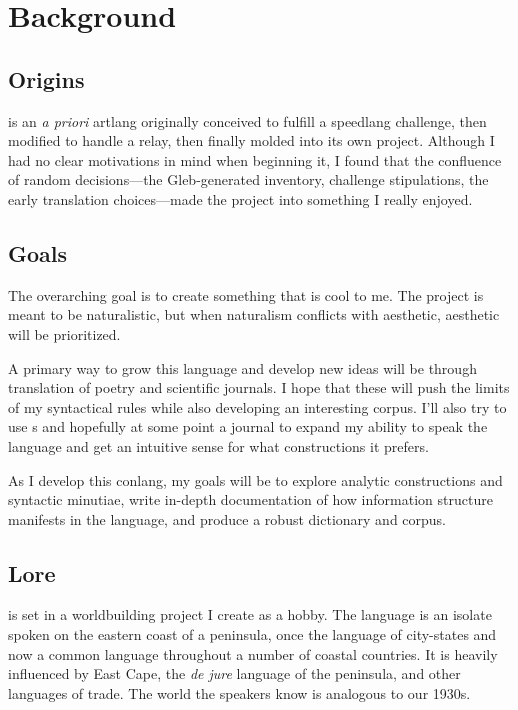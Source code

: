 \setchapterpreamble[u]{\margintoc}
\chapter{Background}
\section{Origins}
\langname{} is an \emph{a priori} artlang originally conceived to fulfill a speedlang challenge, then modified to handle a relay, then finally molded into its own project. Although I had no clear motivations in mind when beginning it, I found that the confluence of random decisions---the Gleb-generated inventory, challenge stipulations, the early translation choices---made the project into something I really enjoyed.

\section{Goals}
The overarching goal is to create something that is cool to me. The project is meant to be naturalistic, but when naturalism conflicts with aesthetic, aesthetic will be prioritized.

A primary way to grow this language and develop new ideas will be through translation of poetry and scientific journals. I hope that these will push the limits of my syntactical rules while also developing an interesting corpus. I'll also try to use s and hopefully at some point a journal to expand my ability to speak the language and get an intuitive sense for what constructions it prefers.

As I develop this conlang, my goals will be to explore analytic constructions and syntactic minutiae, write in-depth documentation of how information structure manifests in the language, and produce a robust dictionary and corpus.

\section{Lore}
\langname{} is set in a worldbuilding project I create as a hobby. The language is an isolate spoken on the eastern coast of a peninsula, once the language of city-states and now a common language throughout a number of coastal countries. It is heavily influenced by East Cape, the \emph{de jure} language of the peninsula, and other languages of trade. The world the speakers know is analogous to our 1930s.

\setchapterpreamble[u]{\margintoc}

